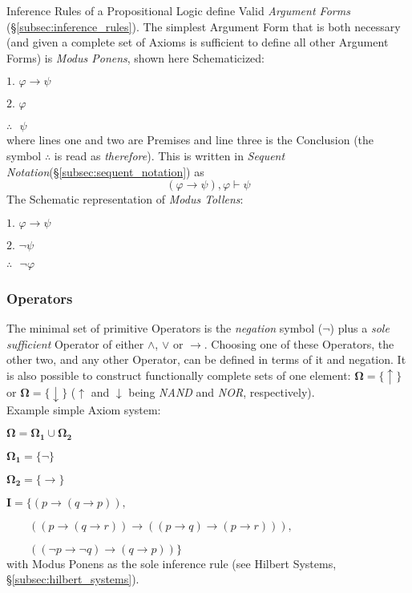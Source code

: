 \documentclass{article}
\begin{document}
Inference Rules of a Propositional Logic define Valid \emph{Argument
  Forms} (\S\ref{subsec:inference_rules}). The simplest Argument Form
that is both necessary (and given a complete set of Axioms is
sufficient to define all other Argument Forms) is \emph{Modus Ponens},
shown here Schematicized:

$\textrm{1. }\varphi \rightarrow \psi$

$\textrm{2. }\varphi$

$\therefore\textrm{ }\psi$
\\
where lines one and two are Premises and line three is the Conclusion
(the symbol $\therefore$ is read as \emph{therefore}). This is written in
\emph{Sequent Notation}(\S\ref{subsec:sequent_notation}) as
\[(\varphi \rightarrow \psi), \varphi \vdash \psi\]
The Schematic representation of \emph{Modus Tollens}:

$\textrm{1. }\varphi \rightarrow \psi$

$\textrm{2. }\neg\psi$

$\therefore\textrm{ }\neg\varphi$

\subsubsection{Operators}

The minimal set of primitive Operators is the \emph{negation} symbol
($\neg$) plus a \emph{sole sufficient} Operator of either $\land$,
$\lor$ or $\rightarrow$. Choosing one of these Operators, the other
two, and any other Operator, can be defined in terms of it and
negation. It is also possible to construct functionally complete sets
of one element: $\mathbf{\Omega} = \{\uparrow\}$ or $\mathbf{\Omega} =
\{\downarrow\}$ ($\uparrow$ and $\downarrow$ being \emph{NAND} and
\emph{NOR}, respectively).
\\
Example simple Axiom system:

$\mathbf{\Omega} = \mathbf{\Omega_1} \cup \mathbf{\Omega_2}$

$\mathbf{\Omega_1} = \{\neg\}$

$\mathbf{\Omega_2} = \{\rightarrow\}$

$\mathbf{I} = \{ (p \rightarrow (q \rightarrow p)),$

$\qquad((p \rightarrow (q \rightarrow r)) \rightarrow
(( p \rightarrow q) \rightarrow (p \rightarrow r))),$

$\qquad(( \neg p \rightarrow \neg q ) \rightarrow (q \rightarrow p ))
\}$\\ with Modus Ponens as the sole inference rule (see Hilbert
Systems, \S\ref{subsec:hilbert_systems}).
\end{document}
